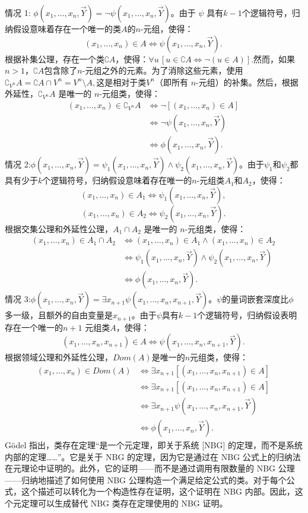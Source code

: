 情况 1:
\(\phi(x_1, \dots, x_n, \vec{Y}) = \neg \psi(x_1, \dots, x_n,\vec{Y})\)。由于 \(\psi\) 具有\(k - 1\)个逻辑符号，归纳假设意味着存在一个唯一的类\(A\)的\(n\)-元组，使得：
\[
(x_1, \dots, x_n) \in A \iff \psi(x_1, \dots, x_n, \vec{Y}).~
\]
根据补集公理，存在一个类\(\complement A\)，使得：\(\forall u \, [u \in \complement A\iff \neg(u \in A)]\).然而，如果\(n > 1\)，\(\complement A\)包含除了\(n\)-元组之外的元素。为了消除这些元素，使用\(\complement_{V^n} A = \complement A \cap V^n = V^n \setminus A,
\)这是相对于类\(V^n\)（即所有 \(n\)-元组）的补集。然后，根据外延性，\(\complement_{V^n} A\) 是唯一的 \(n\)-元组类，使得：
\[
\begin{aligned}
(x_1, \dots, x_n) \in \complement_{V^n} A &\iff \neg [(x_1, \dots, x_n) \in A]\\
&\iff \neg \psi(x_1, \dots, x_n, \vec{Y})\\
&\iff \phi(x_1, \dots, x_n, \vec{Y}).
\end{aligned}~
\]
情况 2:\(\phi(x_1, \dots, x_n, \vec{Y}) = \psi_1(x_1, \dots, x_n, \vec{Y}) \land \psi_2(x_1, \dots, x_n, \vec{Y})\)。由于\(\psi_1\)和\(\psi_2\)都具有少于\(k\)个逻辑符号，归纳假设意味着存在唯一的\(n\)-元组类\(A_1\)和\(A_2\)，使得：
\[
(x_1, \dots, x_n) \in A_1 \iff \psi_1(x_1, \dots, x_n, \vec{Y}),~
\]
\[
(x_1, \dots, x_n) \in A_2 \iff \psi_2(x_1, \dots, x_n,\vec{Y}).~
\]
根据交集公理和外延性公理，\(A_1 \cap A_2\) 是唯一的 \(n\)-元组类，使得：
\[
\begin{aligned}
(x_1, \dots, x_n) \in A_1 \cap A_2 &\iff (x_1, \dots, x_n) \in A_1 \land (x_1, \dots, x_n) \in A_2\\
&\iff \psi_1(x_1, \dots, x_n, \vec{Y}) \land \psi_2(x_1, \dots, x_n, \vec{Y})\\
&\iff \phi(x_1, \dots, x_n, \vec{Y}).
\end{aligned}~
\]
情况 3:\(\phi(x_1, \dots, x_n, \vec{Y}) = \exists x_{n+1} \psi(x_1, \dots, x_n, x_{n+1}, \vec{Y})\)。\(\psi\)的量词嵌套深度比\(\phi\) 多一级，且额外的自由变量是\(x_{n+1}\)。由于\(\psi\)具有\(k-1\)个逻辑符号，归纳假设表明存在一个唯一的\(n+1\) 元组类\(A\)，使得：
\[
(x_1, \dots, x_n, x_{n+1}) \in A \iff \psi(x_1, \dots, x_n, x_{n+1},\vec{Y}).~
\]
根据领域公理和外延性公理，\(Dom(A)\)是唯一的\(n\)元组类，使得：
\[
\begin{aligned}
(x_1, \dots, x_n) \in Dom(A) &\iff \exists x_{n+1} [(x_1, \dots, x_n, x_{n+1}) \in A]\\
&\iff \exists x_{n+1} [(x_1, \dots, x_n, x_{n+1}) \in A]\\
&\iff \exists x_{n+1} \psi(x_1, \dots, x_n, x_{n+1}, \vec{Y})\\
&\iff \phi(x_1, \dots, x_n, \vec{Y}).
\end{aligned}~
\]
Gödel 指出，类存在定理“是一个元定理，即关于系统 [NBG] 的定理，而不是系统内部的定理……”。它是关于 NBG 的定理，因为它是通过在 NBG 公式上的归纳法在元理论中证明的。此外，它的证明——而不是通过调用有限数量的 NBG 公理——归纳地描述了如何使用 NBG 公理构造一个满足给定公式的类。对于每个公式，这个描述可以转化为一个构造性存在证明，这个证明在 NBG 内部。因此，这个元定理可以生成替代 NBG 类存在定理使用的 NBG 证明。

